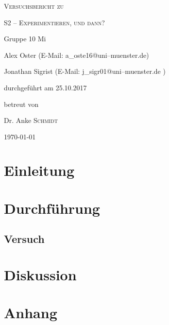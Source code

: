 \documentclass[11pt,a4paper,titlepage, ngerman]{article}
\begin{document}
	\setlength{\parindent}{0em} 
	
	\begin{titlepage}
		\centering
		{\scshape\LARGE Versuchsbericht zu \par}
		\vspace{1cm}
		{\scshape\huge S2 -- Experimentieren, und dann?\par}
		\vspace{2.5cm}
		{\LARGE Gruppe 10 Mi\par}
		\vspace{0.5cm}
		{\large Alex Oster (E-Mail: a\_oste16@uni--muenster.de) \par}
		{\large Jonathan Sigrist (E-Mail: j\_sigr01@uni--muenster.de ) \par}
		\vfill
		durchgeführt am 25.10.2017\par
		betreut von\par
		{\large Dr. Anke \textsc{Schmidt}}
		
		\vfill
		
		{\large \today\par}
	\end{titlepage}
		
	\tableofcontents
	
	\newpage
	
	\section{Einleitung}
		\label{Einleitung}
	
	\newpage
	\section{Durchführung}
		\label{Durchführung}
		
		\subsection{Versuch}
			\label{2.1}
					
	\newpage
	\section{Diskussion}	
		\label{Diskussion}		
		
		\newpage
	\section{Anhang}
		\label{Anhang}
	
\end{document}
